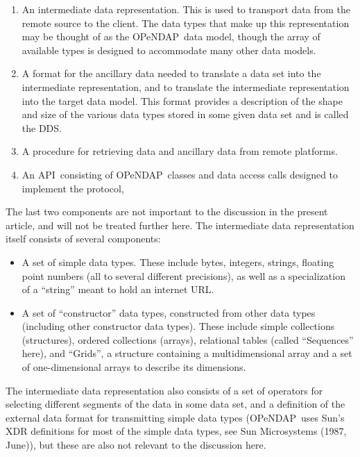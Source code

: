 \documentclass{codata}
\newcommand{\opendap}{\ac{OPeNDAP}}
\newcommand{\dds}{\ac{DDS}}
\newcommand{\api}{\ac{API}}
\begin{document}
\begin{enumerate}
  
\item An intermediate data representation. This is used to transport
  data from the remote source to the client. The data types that make
  up this representation may be thought of as the \opendap\ data
  model, though the array of available types is designed to
  accommodate many other data models.
\item A format for the ancillary data needed to translate a data set
  into the intermediate representation, and to translate the
  intermediate representation into the target data model. This
  format provides a description of the shape and size of the various 
  data types stored in some given data set and is called the \dds.

\item A procedure for retrieving data and ancillary data from
  remote platforms.
\item An \api\ consisting of \opendap\ classes and data access
  calls designed to implement the protocol,
\end{enumerate}

The last two components are not important to the discussion in the
present article, and will not be treated further here.  The intermediate
data representation itself consists of several components:

\begin{itemize}
\item A set of simple data types.  These include bytes, integers,
  strings, floating point numbers (all to several different
  precisions), as well as a specialization of a ``string'' meant to hold an
  internet \ac{URL}. 
\item A set of ``constructor'' data types, constructed from other data
  types (including other constructor data types).  These include
  simple collections (structures), ordered collections (arrays),
  relational tables (called ``Sequences'' here), and ``Grids'', a
  structure containing a multidimensional array and a set of
  one-dimensional arrays to describe its dimensions.
\end{itemize}

The intermediate data representation also consists of a set of
operators for selecting different segments of the data in some data
set, and a definition of the external data format for transmitting
simple data types (\opendap\ uses Sun's XDR definitions for most of
the simple data types, see Sun Microsystems (1987, June)), but these
are also not relevant to the discussion here.
\end{document}
